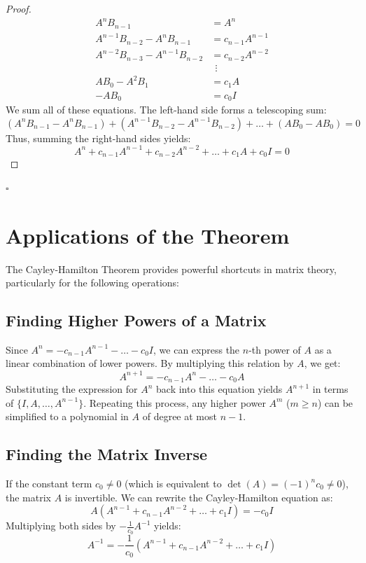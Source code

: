 \documentclass[12pt,a4paper]{report}
\theoremstyle{definition}
\numberwithin{equation}{chapter}
\begin{document}
\begin{proof}
\begin{align}
A^n B_{n-1} &= A^n \\
A^{n-1}B_{n-2} - A^n B_{n-1} &= c_{n-1} A^{n-1} \\
A^{n-2}B_{n-3} - A^{n-1} B_{n-2} &= c_{n-2} A^{n-2} \\
&\ \ \vdots \\
AB_0 - A^2 B_1 &= c_1 A \\
-AB_0 &= c_0 I
\end{align}
We sum all of these equations. The left-hand side forms a telescoping sum:
\begin{equation}
(A^n B_{n-1} - A^n B_{n-1}) + (A^{n-1}B_{n-2} - A^{n-1}B_{n-2}) + \dots + (AB_0 - AB_0) = 0
\end{equation}
Thus, summing the right-hand sides yields:
\begin{equation}
A^n + c_{n-1}A^{n-1} + c_{n-2}A^{n-2} + \dots + c_1 A + c_0 I = 0
\end{equation}
\end{proof}
\hfill $\square$

\section{Applications of the Theorem}
The Cayley-Hamilton Theorem provides powerful shortcuts in matrix theory, particularly for the following operations:

\subsection{Finding Higher Powers of a Matrix}
Since $A^n = -c_{n-1}A^{n-1} - \dots - c_0 I$, we can express the $n$-th power of $A$ as a linear combination of lower powers. By multiplying this relation by $A$, we get:
\begin{equation}
A^{n+1} = -c_{n-1}A^n - \dots - c_0 A
\end{equation}
Substituting the expression for $A^n$ back into this equation yields $A^{n+1}$ in terms of $\{I, A, \ldots, A^{n-1}\}$. Repeating this process, any higher power $A^m$ ($m \ge n$) can be simplified to a polynomial in $A$ of degree at most $n-1$.

\subsection{Finding the Matrix Inverse}
If the constant term $c_0 \ne 0$ (which is equivalent to $\det(A) = (-1)^n c_0 \ne 0$), the matrix $A$ is invertible. We can rewrite the Cayley-Hamilton equation as:
\begin{equation}
A \left( A^{n-1} + c_{n-1}A^{n-2} + \dots + c_1 I \right) = -c_0 I
\end{equation}
Multiplying both sides by $-\frac{1}{c_0} A^{-1}$ yields:
\begin{equation}
A^{-1} = -\frac{1}{c_0} \left( A^{n-1} + c_{n-1}A^{n-2} + \dots + c_1 I \right)
\end{equation}
\end{document}
